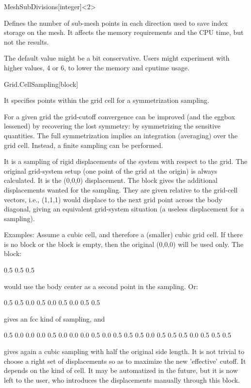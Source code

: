 \begin{fdfentry}{MeshSubDivisions}[integer]<$2$>
  
  Defines the number of sub-mesh points in each direction used
  to save index storage on the mesh. It affects the memory
  requirements and the CPU time, but not the results. 

  \note The default value might be a bit conservative. Users might
  experiment with higher values, 4 or 6, to lower the memory and
  cputime usage.

\end{fdfentry}

\begin{fdfentry}{Grid.CellSampling}[block]

  It specifies points within the grid cell for a symmetrization
  sampling.

  For a given grid the grid-cutoff convergence can be improved (and
  the eggbox lessened) by recovering the lost symmetry: by
  symmetrizing the sensitive quantities. The full symmetrization
  implies an integration (averaging) over the grid cell. Instead, a
  finite sampling can be performed.

  It is a sampling of rigid displacements of the system with respect
  to the grid. The original grid-system setup (one point of the grid
  at the origin) is always calculated. It is the (0,0,0) displacement.
  The block  gives the additional
  displacements wanted for the sampling. They are given relative to
  the grid-cell vectors, i.e., (1,1,1) would displace to the next grid
  point across the body diagonal, giving an equivalent grid-system
  situation (a useless displacement for a sampling).

  Examples: Assume a cubic cell, and therefore a (smaller) cubic grid
  cell.  If there is no block or the block is empty, then the original
  (0,0,0) will be used only. The block:
  \begin{fdfexample}
        0.5    0.5    0.5
  \end{fdfexample}
  would use the body center as a second point in the sampling. Or:
  \begin{fdfexample}
        0.5    0.5    0.0
        0.5    0.0    0.5
        0.0    0.5    0.5
  \end{fdfexample}
  gives an fcc kind of sampling, and
  \begin{fdfexample}
        0.5    0.0    0.0
        0.0    0.5    0.0
        0.0    0.0    0.5
        0.0    0.5    0.5
        0.5    0.0    0.5
        0.5    0.5    0.0
        0.5    0.5    0.5
  \end{fdfexample}
  gives again a cubic sampling with half the original side length.  It
  is not trivial to choose a right set of displacements so as to
  maximize the new 'effective' cutoff. It depends on the kind of
  cell. It may be automatized in the future, but it is now left to the
  user, who introduces the displacements manually through this block.


\end{fdfentry}
